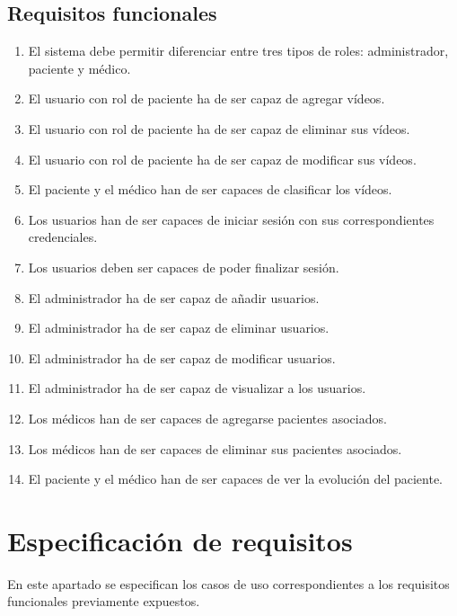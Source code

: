 \subsection{Requisitos funcionales}
\begin{enumerate}[label=\textbf{RF\arabic*:}]

\item El sistema debe permitir diferenciar entre tres tipos de roles: administrador, paciente y médico.
\item El usuario con rol de paciente ha de ser capaz de agregar vídeos.
\item El usuario con rol de paciente ha de ser capaz de eliminar sus vídeos.
\item El usuario con rol de paciente ha de ser capaz de modificar sus vídeos.
\item El paciente y el médico han de ser capaces de clasificar los vídeos.
\item Los usuarios han de ser capaces de iniciar sesión con sus correspondientes credenciales.
\item Los usuarios deben ser capaces de poder finalizar sesión.
\item El administrador ha de ser capaz de añadir usuarios.
\item El administrador ha de ser capaz de eliminar usuarios.
\item El administrador ha de ser capaz de modificar usuarios.
\item El administrador ha de ser capaz de visualizar a los usuarios.
\item Los médicos han de ser capaces de agregarse pacientes asociados.
\item Los médicos han de ser capaces de eliminar sus pacientes asociados.
\item El paciente y el médico han de ser capaces de ver la evolución del paciente.


\end{enumerate}
\section{Especificación de requisitos}

En este apartado se especifican los casos de uso correspondientes  a los requisitos funcionales previamente expuestos.

